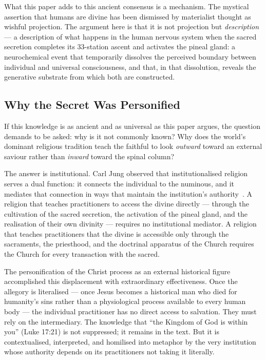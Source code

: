\documentclass[12pt, a4paper]{article}
\begin{document}
What this paper adds to this ancient consensus is a mechanism. The mystical
assertion that humans are divine has been dismissed by materialist thought as
wishful projection. The argument here is that it is not projection but
\emph{description} — a description of what happens in the human nervous system
when the sacred secretion completes its 33-station ascent and activates the
pineal gland: a neurochemical event that temporarily dissolves the
perceived boundary between individual and universal consciousness, and that,
in that dissolution, reveals the generative substrate from which both are
constructed.

\subsection{Why the Secret Was Personified}

If this knowledge is as ancient and as universal as this paper argues, the
question demands to be asked: why is it not commonly known? Why does the world's
dominant religious tradition teach the faithful to look \emph{outward} toward
an external saviour rather than \emph{inward} toward the spinal column?

The answer is institutional. Carl Jung observed that institutionalised religion
serves a dual function: it connects the individual to the numinous, and it
mediates that connection in ways that maintain the institution's
authority~\autocite[40]{jung1958}. A religion that teaches practitioners to
access the divine directly — through the cultivation of the sacred secretion, the
activation of the pineal gland, and the realisation of their own divinity —
requires no institutional mediator. A religion that teaches practitioners that
the divine is accessible only through the sacraments, the priesthood, and the
doctrinal apparatus of the Church requires the Church for every transaction
with the sacred.

The personification of the Christ process as an external historical figure
accomplished this displacement with extraordinary effectiveness. Once the
allegory is literalised — once Jesus becomes a historical man who died for
humanity's sins rather than a physiological process available to every human
body — the individual practitioner has no direct access to salvation. They
must rely on the intermediary. The knowledge that ``the Kingdom of God is
within you'' (Luke 17:21) is not suppressed; it remains in the text. But it is
contextualised, interpreted, and homilised into metaphor by the very
institution whose authority depends on its practitioners not taking it
literally.
\end{document}
